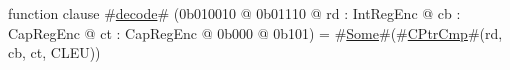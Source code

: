 function clause #\hyperref[sailMIPSzdecode]{decode}# (0b010010 @ 0b01110 @ rd : IntRegEnc @ cb : CapRegEnc @ ct : CapRegEnc @ 0b000 @ 0b101) = #\hyperref[sailMIPSzSome]{Some}#(#\hyperref[sailMIPSzCPtrCmp]{CPtrCmp}#(rd, cb, ct, CLEU))
